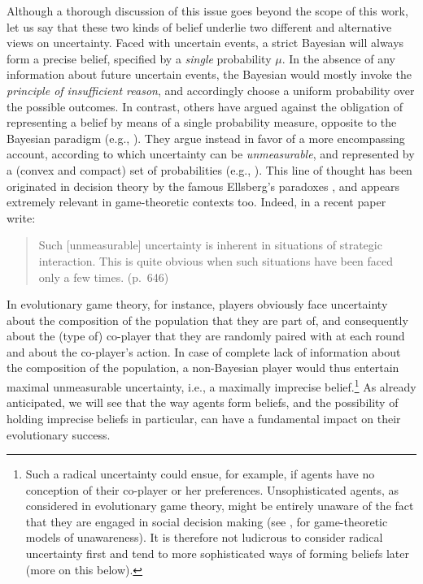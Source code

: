 \documentclass[fleqn,reqno,12pt]{article}
\theoremstyle{Satz}
\theoremstyle{Bsp}
\begin{document}
Although a thorough discussion of this issue goes beyond the scope of this work, let us say
that these two kinds of belief underlie two different and alternative views on
uncertainty. Faced with uncertain events, a strict Bayesian will always form a precise belief,
specified by a \textit{single} probability $\mu$. In the absence of any information about
future uncertain events, the Bayesian would mostly invoke the \textit{principle of insufficient
  reason}, and accordingly choose a uniform probability over the possible outcomes. In
contrast, others have argued against the obligation of representing a belief by means of a
single probability measure, opposite to the Bayesian paradigm (e.g., \cite{GilbMarin13}). They argue
instead in favor of a more encompassing account, according to which uncertainty can be \emph{unmeasurable},
and represented by a (convex and compact) set of probabilities (e.g., \cite{gilsch89}). This line of thought has been
originated in decision theory by the famous Ellsberg's paradoxes \citep{ells61}, and appears extremely
relevant in game-theoretic contexts too. Indeed, in a recent paper \citet{BattCerrMM15}
write:

\begin{quote}
  Such [unmeasurable] uncertainty is inherent in situations of strategic interaction. This is quite obvious
  when such situations have been faced only a few times. (p.~646)
\end{quote}

\noindent In evolutionary game theory, for instance, players obviously face uncertainty
about the composition of the population that they are part of, and consequently about the (type of)
co-player that they are randomly paired with at each round and about the co-player's action. In
case of complete lack of information about the composition of the population, a non-Bayesian player would thus entertain maximal
unmeasurable uncertainty, i.e., a maximally imprecise belief.\footnote{Such a radical
  uncertainty could ensue, for example, if agents have no conception of their co-player or her
  preferences. Unsophisticated agents, as considered in evolutionary game theory, might be
  entirely unaware of the fact that they are engaged in social decision making (see \cite{HeifetzMeier2009:Dynamic-Unaware}, for
  game-theoretic models of unawareness). It is therefore
  not ludicrous to consider radical uncertainty first and tend to more
  sophisticated ways of forming beliefs later (more on this below).} As already anticipated, we
will see that the way agents form beliefs, and the possibility of holding imprecise beliefs
in particular, can have a fundamental impact on their evolutionary success.
\end{document}
